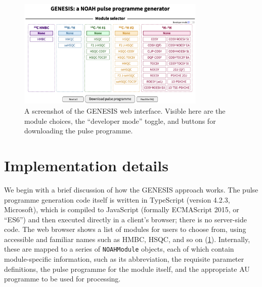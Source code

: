 \documentclass[a4paper,11pt]{article}
\begin{document}
\begin{refsection}
\begin{figure}
    \centering
    \includegraphics[width=0.8\textwidth]{screenshot.png}
    \caption{
        A screenshot of the GENESIS web interface.
        Visible here are the module choices, the ``developer mode'' toggle, and buttons for downloading the pulse programme.
    }
    \label{fig:screenshot}
\end{figure}

\section{Implementation details}

We begin with a brief discussion of how the GENESIS approach works.
The pulse programme generation code itself is written in TypeScript (version 4.2.3, Microsoft), which is compiled to JavaScript (formally ECMAScript 2015, or ``ES6'') and then executed directly in a client's browser; there is no server-side code.
The web browser shows a list of modules for users to choose from, using accessible and familiar names such as HMBC, HSQC, and so on (\cref{fig:screenshot}).
Internally, these are mapped to a series of \texttt{NOAHModule} objects, each of which contain module-specific information, such as its abbreviation, the requisite parameter definitions, the pulse programme for the module itself, and the appropriate AU programme to be used for processing. 


\end{refsection}
\end{document}
